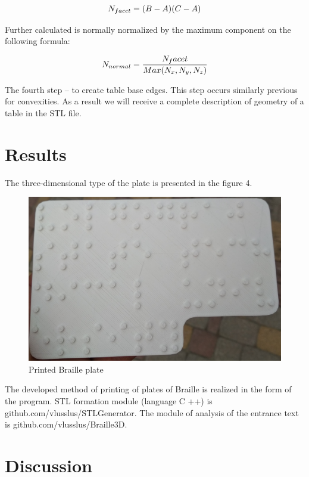 \documentclass[journal,article,submit,moreauthors,pdftex,10pt,a4paper]{mdpi}
\begin{document}
\begin{equation}
\mathnormal{N_{facet}=(B-A)(C-A)}
\end{equation}

Further calculated is normally normalized by the maximum component on the following formula:

\begin{equation}
\mathnormal{N_{normal}=\frac{N_facet}{Max(N_{x},N_{y},N_{z})}}
\end{equation}

The fourth step – to create table base edges. This step occurs similarly previous for convexities.
As a result we will receive a complete description of geometry of a table in the STL file.


\section{Results}

The three-dimensional type of the plate is presented in the figure 4.

\begin{figure}[H]
\centering
\includegraphics[width=10 cm]{Braille-plate-foto.jpg}
\caption{Printed Braille plate}
\end{figure} 

The developed method of printing of plates of Braille is realized in the form of the program. STL formation module (language C ++) is github.com/vlusslus/STLGenerator. The module of analysis of the entrance text is github.com/vlusslus/Braille3D.



\section{Discussion}
\end{document}
